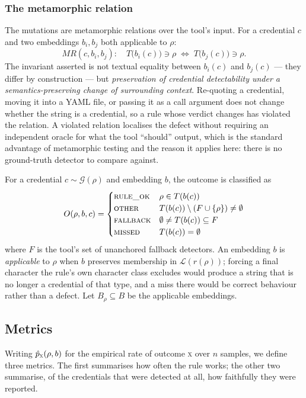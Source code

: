 \documentclass[pdflatex,sn-basic]{sn-jnl}
\begin{document}
\subsubsection*{The metamorphic relation}
\label{sec:mr}

The mutations are metamorphic relations over the tool's input. For a credential $c$ and two embeddings $b_i, b_j$ both applicable to $\rho$:
\[
\mathit{MR}(c, b_i, b_j):\quad
T\bigl(b_i(c)\bigr) \ni \rho \;\Longleftrightarrow\; T\bigl(b_j(c)\bigr) \ni \rho .
\]
The invariant asserted is not textual equality between $b_i(c)$ and $b_j(c)$ --- they differ by construction --- but \emph{preservation of credential detectability under a semantics-preserving change of surrounding context}. Re-quoting a credential, moving it into a YAML file, or passing it as a call argument does not change whether the string is a credential, so a rule whose verdict changes has violated the relation. A violated relation localises the defect without requiring an independent oracle for what the tool ``should'' output, which is the standard advantage of metamorphic testing and the reason it applies here: there is no ground-truth detector to compare against.

For a credential $c \sim \mathcal{G}(\rho)$ and embedding $b$, the outcome is classified as
\[
O(\rho,b,c)=
\begin{cases}
\textsc{rule\_ok} & \rho \in T(b(c))\\
\textsc{other} & T(b(c)) \setminus (F \cup \{\rho\}) \neq \emptyset\\
\textsc{fallback} & \emptyset \neq T(b(c)) \subseteq F\\
\textsc{missed} & T(b(c)) = \emptyset
\end{cases}
\]
where $F$ is the tool's set of unanchored fallback detectors. An embedding $b$ is \emph{applicable} to $\rho$ when $b$ preserves membership in $\mathcal{L}(r(\rho))$; forcing a final character the rule's own character class excludes would produce a string that is no longer a credential of that type, and a miss there would be correct behaviour rather than a defect. Let $B_\rho \subseteq B$ be the applicable embeddings.

\subsection{Metrics}
\label{sec:metrics}

Writing $\hat p_{\textsc{x}}(\rho,b)$ for the empirical rate of outcome \textsc{x} over $n$ samples, we define three metrics. The first summarises how often the rule works; the other two summarise, of the credentials that were detected at all, how faithfully they were reported.
\end{document}

